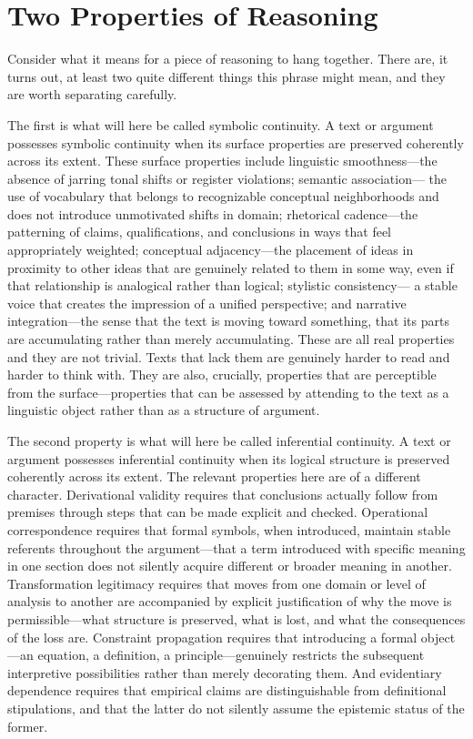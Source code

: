 \documentclass[12pt, openright, twoside]{book}
\begin{document}
\section{Two Properties of Reasoning}

Consider what it means for a piece of reasoning to hang together. There are, it
turns out, at least two quite different things this phrase might mean, and they
are worth separating carefully.

The first is what will here be called symbolic continuity. A text or argument
possesses symbolic continuity when its surface properties are preserved coherently
across its extent. These surface properties include linguistic smoothness---the
absence of jarring tonal shifts or register violations; semantic association---
the use of vocabulary that belongs to recognizable conceptual neighborhoods and
does not introduce unmotivated shifts in domain; rhetorical cadence---the
patterning of claims, qualifications, and conclusions in ways that feel
appropriately weighted; conceptual adjacency---the placement of ideas in
proximity to other ideas that are genuinely related to them in some way, even
if that relationship is analogical rather than logical; stylistic consistency---
a stable voice that creates the impression of a unified perspective; and narrative
integration---the sense that the text is moving toward something, that its parts
are accumulating rather than merely accumulating. These are all real properties
and they are not trivial. Texts that lack them are genuinely harder to read and
harder to think with. They are also, crucially, properties that are perceptible
from the surface---properties that can be assessed by attending to the text as
a linguistic object rather than as a structure of argument.

The second property is what will here be called inferential continuity. A text
or argument possesses inferential continuity when its logical structure is
preserved coherently across its extent. The relevant properties here are of a
different character. Derivational validity requires that conclusions actually
follow from premises through steps that can be made explicit and checked.
Operational correspondence requires that formal symbols, when introduced, maintain
stable referents throughout the argument---that a term introduced with specific
meaning in one section does not silently acquire different or broader meaning
in another. Transformation legitimacy requires that moves from one domain or
level of analysis to another are accompanied by explicit justification of why
the move is permissible---what structure is preserved, what is lost, and what
the consequences of the loss are. Constraint propagation requires that introducing
a formal object---an equation, a definition, a principle---genuinely restricts
the subsequent interpretive possibilities rather than merely decorating them.
And evidentiary dependence requires that empirical claims are distinguishable
from definitional stipulations, and that the latter do not silently assume the
epistemic status of the former.
\end{document}
